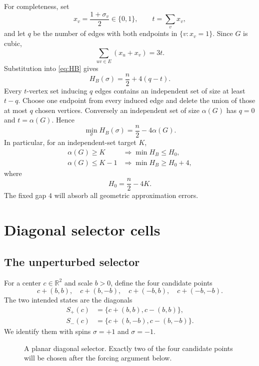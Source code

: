 \documentclass[12pt,a4paper]{article}
\newcommand{\R}{\mathbb{R}}
\begin{document}
For completeness, set
\[
 x_v=\frac{1+\sigma_v}{2}\in\{0,1\},\qquad
 t=\sum_v x_v,
\]
and let $q$ be the number of edges with both endpoints in $\{v:x_v=1\}$.  Since $G$ is cubic,
\[
 \sum_{uv\in E}(x_u+x_v)=3t.
\]
Substitution into \eqref{eq:HB} gives
\begin{equation}\label{eq:barahona-id}
 H_B(\sigma)=\frac n2+4(q-t).
\end{equation}
Every $t$-vertex set inducing $q$ edges contains an independent set of size at least $t-q$.  Choose one endpoint from every induced edge and delete the union of those at most $q$ chosen vertices.  Conversely an independent set of size $\alpha(G)$ has $q=0$ and $t=\alpha(G)$.  Hence
\begin{equation}\label{eq:barahona-min}
 \min_\sigma H_B(\sigma)=\frac n2-4\alpha(G).
\end{equation}
In particular, for an independent-set target $K$,
\begin{align}
 \alpha(G)\ge K&\Longrightarrow \min H_B\le H_0,\label{eq:source-yes}\\
 \alpha(G)\le K-1&\Longrightarrow \min H_B\ge H_0+4,\label{eq:source-no}
\end{align}
where
\begin{equation}\label{eq:H0}
 H_0=\frac n2-4K.
\end{equation}
The fixed gap $4$ will absorb all geometric approximation errors.

\section{Diagonal selector cells}\label{sec:selector}

\subsection{The unperturbed selector}

For a center $c\in\R^2$ and scale $b>0$, define the four candidate points
\[
 c+(b,b),\quad c+(b,-b),\quad c+(-b,b),\quad c+(-b,-b).
\]
The two intended states are the diagonals
\begin{align*}
 S_+(c)&=\{c+(b,b),c-(b,b)\},\\
 S_-(c)&=\{c+(b,-b),c-(b,-b)\}.
\end{align*}
We identify them with spins $\sigma=+1$ and $\sigma=-1$.

\begin{figure}[ht]
\centering
{}
\caption{A planar diagonal selector. Exactly two of the four candidate points will be chosen after the forcing argument below.}
\label{fig:selector}
\end{figure}
\end{document}
